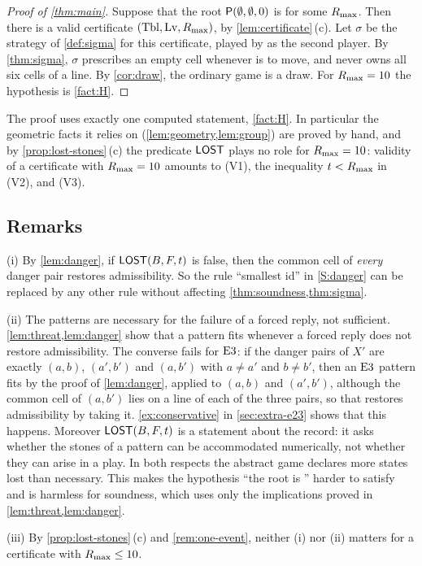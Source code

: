 \begin{proof}[Proof of \cref{thm:main}]
Suppose that the root $\mathsf{P}(\emptyset,\emptyset,0)$ is \WON{} for some $R_{\max}$. Then there is a valid
certificate $(\mathrm{Tbl},\mathrm{Lv},R_{\max})$, by \cref{lem:certificate}\,(c). Let $\sigma$ be the strategy of
\cref{def:sigma} for this certificate, played by \Breaker{} as the second player. By
\cref{thm:sigma}, $\sigma$ prescribes an empty cell whenever \Breaker{} is to move, and \Maker{} never
owns all six cells of a line. By \cref{cor:draw}, the ordinary game is a draw. For $R_{\max}=10$ the
hypothesis is \cref{fact:H}.
\end{proof}

The proof uses exactly one computed statement, \cref{fact:H}. In particular the geometric facts
it relies on (\cref{lem:geometry,lem:group}) are proved by hand, and by
\cref{prop:lost-stones}\,(c) the predicate $\mathsf{LOST}$ plays no role for $R_{\max}=10$: validity of a
certificate with $R_{\max}=10$ amounts to (V1), the inequality $t<R_{\max}$ in (V2), and (V3).

\subsection{Remarks}\label{sec:game-remarks}

\begin{remark}\label{rem:conservative}
(i) By \cref{lem:danger}, if $\mathsf{LOST}(B,F,t)$ is false, then the common cell of \emph{every} danger pair
restores admissibility. So the rule ``smallest id'' in \ref{S:danger} can be replaced by any other rule
without affecting \cref{thm:soundness,thm:sigma}.

(ii) The patterns are necessary for the failure of a forced reply, not sufficient. \cref{lem:threat,lem:danger} show that a pattern fits whenever a forced reply does not restore admissibility. The
converse fails for $\mathrm{E3}$: if the danger pairs of $X'$ are exactly $(a,b)$, $(a',b')$ and $(a,b')$ with
$a\ne a'$ and $b\ne b'$, then an $\mathrm{E3}$ pattern fits by the proof of \cref{lem:danger}, applied to
$(a,b)$ and $(a',b')$, although the common cell of $(a,b')$ lies on a line of each of the three pairs, so
that \Breaker{} restores admissibility by taking it. \cref{ex:conservative} in \cref{sec:extra-e23} shows that this happens.
Moreover $\mathsf{LOST}(B,F,t)$ is a statement about the record: it asks whether the stones of a pattern can be
accommodated numerically, not whether they can arise in a play. In both respects the abstract game declares
more states lost than necessary. This makes the hypothesis ``the root is \WON'' harder to satisfy and is
harmless for soundness, which uses only the implications proved in \cref{lem:threat,lem:danger}.

(iii) By \cref{prop:lost-stones}\,(c) and \cref{rem:one-event}, neither (i) nor (ii) matters
for a certificate with $R_{\max}\le 10$.
\end{remark}


